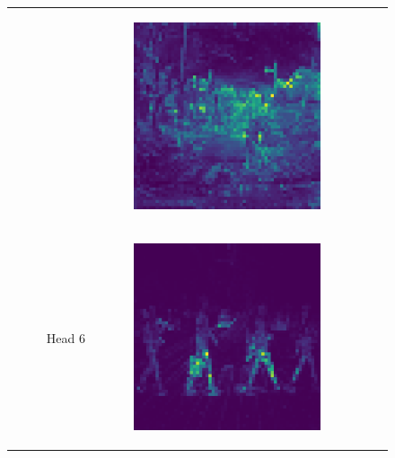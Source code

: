 \begin{figure}
\begin{tabular}{r p{\horspace} p{\horspace} p{\horspace}}
\begin{subfigure}[b]{\subfigwidth}
    \end{subfigure} 
    \hfill &
    \begin{subfigure}[b]{\subfigwidth}
        \includegraphics[width=\subfigwidth]{images/vit_attention/4/attn-head4.png}
    \end{subfigure} \\
    Head 6 &
    \begin{subfigure}[b]{\subfigwidth}
        \includegraphics[width=\subfigwidth]{images/vit_attention/1/attn-head5.png}

\end{subfigure}
\end{tabular}
\end{figure}
